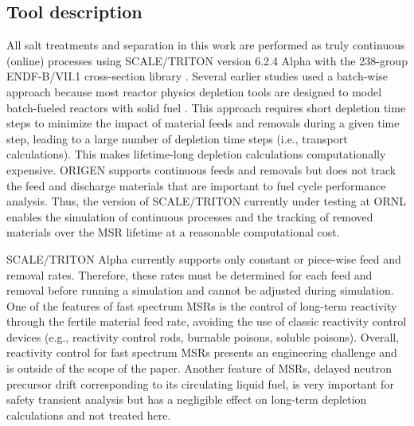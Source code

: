 \documentclass[letterpaper]{mandc2019}
\begin{document}
\subsection{Tool description}
All salt treatments and separation in this work are performed as truly continuous (online) processes using SCALE/TRITON version 6.2.4 Alpha \cite{betzler_implementation_2017-1} with the 238-group ENDF-B/VII.1 cross-section library \cite{rearden_scale_2016}. Several earlier studies used a batch-wise approach because most reactor physics depletion tools are designed to model batch-fueled reactors with solid fuel \cite{betzler_molten_2017,rykhlevskii_online_2017,rykhlevskii_modeling_2019}. This approach requires short depletion time steps to minimize the impact of material feeds and removals during a given time step, leading to a large number of depletion time steps (i.e., transport calculations). This makes lifetime-long depletion calculations computationally expensive. ORIGEN \cite{gauld_isotopic_2011} supports continuous feeds and removals but does not track the feed and discharge materials that are important to fuel cycle performance analysis. Thus, the version of SCALE/TRITON currently under testing at \gls{ORNL} enables the simulation of continuous processes and the tracking of removed materials over the \gls{MSR} lifetime at a reasonable computational cost. \par
SCALE/TRITON Alpha currently supports only constant or piece-wise feed and removal rates. Therefore, these rates must be determined for each feed and removal before running a simulation and cannot be adjusted during simulation. One of the features of fast spectrum \gls{MSR}s is the control of long-term reactivity through the fertile material feed rate, avoiding the use of classic reactivity control devices (e.g., reactivity control rods, burnable poisons, soluble poisons). Overall, reactivity control for fast spectrum \gls{MSR}s presents an engineering challenge and is outside of the scope of the paper. Another feature of \gls{MSR}s, delayed neutron precursor drift corresponding to its circulating liquid fuel, is very important for safety transient analysis but has a negligible effect on long-term depletion calculations and  not treated here. 
\end{document}

